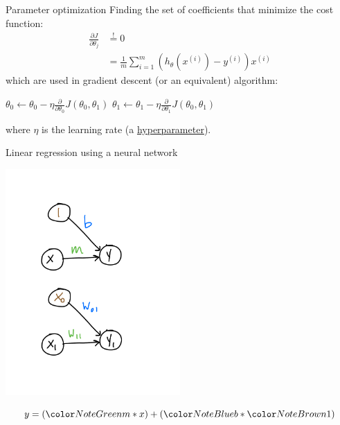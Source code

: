 \documentclass[compress]{beamer}
\makeatletter
\def\mathcolor#1#{\@mathcolor{#1}}
\def\@mathcolor#1#2#3{%
  \protect\leavevmode
  \begingroup
    \color#1{#2}#3%
  \endgroup
}
\makeatother
\begin{document}
\begin{frame}{Parameter optimization}
  Finding the set of coefficients that minimize the cost function:
  \begin{align*}
    \frac{\partial J}{\partial \theta_{j}} &\overset{!}{=} 0 \\
    &= \frac{1}{m} \sum_{i=1}^{m} \left( h_{\theta}(x^{(i)}) - y^{(i)} \right) x^{(i)}
  \end{align*}
  which are used in gradient descent (or an equivalent) algorithm:
  \begin{algorithmic}[1]
    \Repeat
    \State \( \theta_{0} \gets \theta_{0} - \eta \frac{\partial}{\partial \theta_{0}} J(\theta_{0},\theta_{1}) \)
    \State \( \theta_{1} \gets \theta_{1} - \eta \frac{\partial}{\partial \theta_{1}} J(\theta_{0},\theta_{1}) \)
  \end{algorithmic}
  where \(\eta\) is the learning rate (a \underline{hyperparameter}).
\end{frame}

\begin{frame}{Linear regression using a neural network}
  \begin{center}
    \includegraphics[width=0.50\textwidth]{./figures/lr_nn_1_noeqn.pdf}
  \end{center}
  \begin{equation*}
    y = (\mathcolor{NoteGreen}{m} * x) + (\mathcolor{NoteBlue}{b} * \mathcolor{NoteBrown}{1})
  \end{equation*}
\end{frame}
\end{document}
